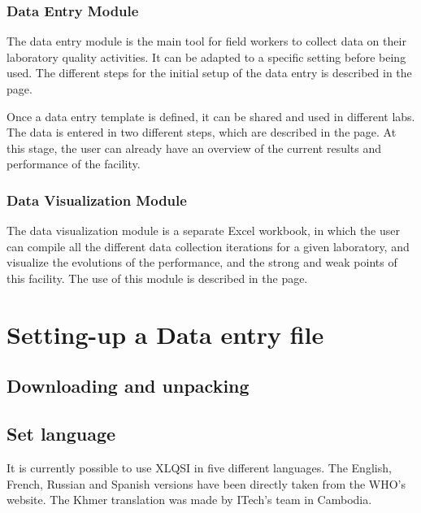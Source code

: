 \documentclass[letterpaper,10pt,english]{sphinxmanual}
\begin{document}
\subsection{Data Entry Module}
\label{\detokenize{intro:data-entry-module}}
The data entry module is the main tool for field workers to collect data on their laboratory quality activities. It can be adapted to a specific setting before being used. The different steps for the initial setup of the data entry is described in the {\hyperref[\detokenize{create_data_entry::doc}]{}} page.

Once a data entry template is defined, it can be shared and used in different labs. The data is entered in two different steps, which are described in the {\hyperref[\detokenize{fill_data_entry::doc}]{}} page. At this stage, the user can already have an overview of the current results and performance of the facility.


\subsection{Data Visualization Module}
\label{\detokenize{intro:data-visualization-module}}
The data visualization module is a separate Excel workbook, in which the user can compile all the different data collection iterations for a given laboratory, and visualize the evolutions of the performance, and the strong and weak points of this facility. The use of this module is described in the {\hyperref[\detokenize{data_viz::doc}]{}} page.


\chapter{Setting-up a Data entry file}
\label{\detokenize{create_data_entry:setting-up-a-data-entry-file}}\label{\detokenize{create_data_entry::doc}}

\section{Downloading and unpacking}
\label{\detokenize{create_data_entry:downloading-and-unpacking}}

\section{Set language}
\label{\detokenize{create_data_entry:set-language}}
It is currently possible to use XLQSI in five different languages. The English, French, Russian and Spanish versions have been directly taken from the WHO’s website. The Khmer translation was made by ITech’s team in Cambodia.
\end{document}
